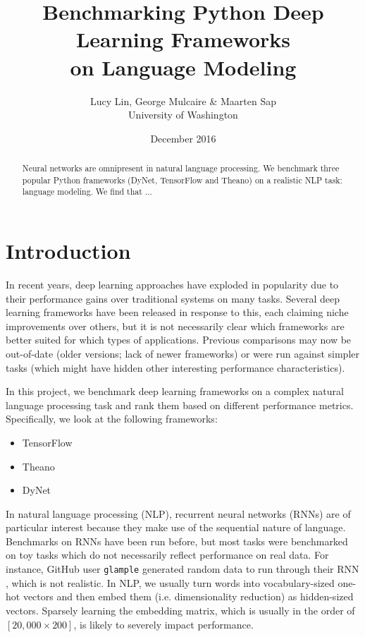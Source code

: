 \documentclass{article}
\title{Benchmarking Python Deep Learning Frameworks\\ on Language Modeling }
\author{Lucy Lin, George Mulcaire \& Maarten Sap
\\University of Washington}
\date{December 2016}
\begin{document}
\maketitle

\begin{abstract}
Neural networks are omnipresent in natural language processing. 
We benchmark three popular Python frameworks (DyNet, TensorFlow and Theano) on a realistic NLP task: language modeling.
We find that ...
\end{abstract}


\section{Introduction}
In recent years, deep learning approaches have exploded in popularity due to their performance gains over traditional systems on many tasks. Several deep learning frameworks have been released in response to this, each claiming niche improvements over others, but it is not necessarily clear which frameworks are better suited for which types of applications. Previous comparisons may now be out-of-date (older versions; lack of newer frameworks) or were run against simpler tasks (which might have hidden other interesting performance characteristics).

In this project, we benchmark deep learning frameworks on a complex natural language processing task and rank them based on different performance metrics. Specifically, we look at the following frameworks:
\begin{itemize}
	\item TensorFlow \cite{tensorflow}
	\item Theano \cite{theano}
	\item DyNet \cite{dynet}
\end{itemize}
In natural language processing (NLP), recurrent neural networks (RNNs) are of particular interest because they make use of the sequential nature of language. Benchmarks on RNNs have been run before, but most tasks were benchmarked on toy tasks which do not necessarily reflect performance on real data. For instance, GitHub user \verb!glample! generated random data to run through their RNN \cite{glample}, which is not realistic. In NLP, we usually turn words into vocabulary-sized one-hot vectors and then embed them (i.e. dimensionality reduction) as hidden-sized vectors. Sparsely learning the embedding matrix, which is usually in the order of $[20,000 \times 200]$, is likely to severely impact performance.
\end{document}
